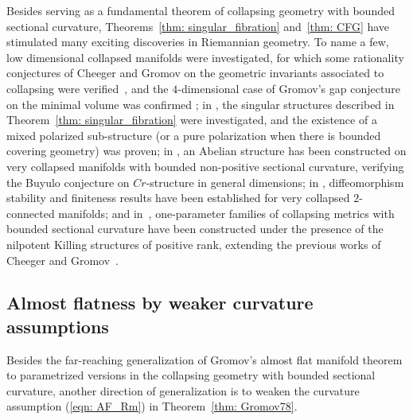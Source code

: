 \documentclass[pdftex]{sigma}
\numberwithin{equation}{section}
\begin{document}
Besides serving as a fundamental theorem of collapsing geometry with
bounded sectional curvature, Theorems~\ref{thm: singular_fibration} and~\ref{thm: CFG} have stimulated many exciting discoveries in Riemannian
geometry. To name a few, low dimensional collapsed manifolds were investigated,
for which some rationality conjectures of Cheeger and Gromov on the geometric
invariants associated to collapsing were verified~\cite{Rong93a, Rong95}, and
the $4$-dimensional case of Gromov's gap conjecture on the minimal volume was
confirmed \cite{Rong93b}; in \cite{CR95, CR96}, the singular structures
described in Theorem~\ref{thm: singular_fibration} were investigated, and the
existence of a mixed polarized sub-structure (or a pure polarization when there
is bounded covering geometry) was proven; in \cite{CCR01, CCR04}, an Abelian
structure has been constructed on very collapsed manifolds with bounded
non-positive sectional curvature, verifying the Buyulo conjecture
\cite{Buyalo90a, Buyalo90b} on $Cr$-structure in general dimensions; in
\cite{FR99, FR02, PRT99, PT99}, diffeomorphism stability and finiteness results
have been established for very collapsed $2$-connected manifolds; and in~\cite{CR09}, one-parameter families of collapsing metrics with bounded
sectional curvature have been constructed under the presence of the nilpotent
Killing structures of positive rank, extending the previous works of Cheeger
and Gromov~\cite{CGI}.

\subsection{Almost flatness by weaker curvature assumptions}\label{section2.2}
Besides the far-reaching generalization of Gromov's almost flat
manifold theorem to paramet\-ri\-zed versions in the collapsing geometry with
bounded sectional curvature, another direction of generalization is to weaken
the curvature assumption (\ref{eqn: AF_Rm}) in Theorem~\ref{thm: Gromov78}.
\end{document}
